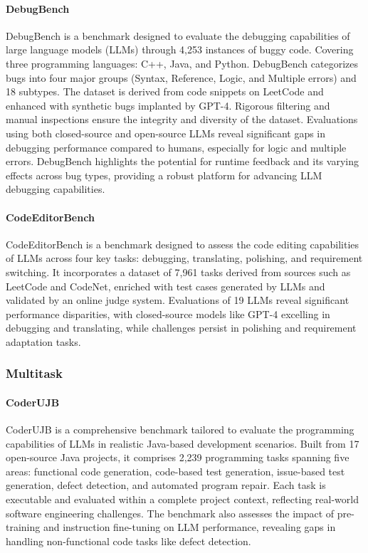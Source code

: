 \paragraph{DebugBench \cite{tian2024debugbench}}
DebugBench is a benchmark designed to evaluate the debugging capabilities of
large language models (LLMs) through 4,253 instances of buggy code. Covering
three programming languages: C++, Java, and Python. DebugBench categorizes bugs
into four major groups (Syntax, Reference, Logic, and Multiple errors) and 18
subtypes. The dataset is derived from code snippets on LeetCode and enhanced
with synthetic bugs implanted by GPT-4. Rigorous filtering and manual
inspections ensure the integrity and diversity of the dataset. Evaluations
using both closed-source and open-source LLMs reveal significant gaps in
debugging performance compared to humans, especially for logic and multiple
errors. DebugBench highlights the potential for runtime feedback and its
varying effects across bug types, providing a robust platform for advancing LLM
debugging capabilities.

\paragraph{CodeEditorBench \cite{guo2024codeeditorbench}}
CodeEditorBench is a benchmark designed to assess the code editing capabilities
of LLMs across four key tasks: debugging, translating,
polishing, and requirement switching. It incorporates a dataset of 7,961 tasks
derived from sources such as LeetCode and CodeNet, enriched with test cases
generated by LLMs and validated by an online judge system. Evaluations of 19
LLMs reveal significant performance disparities, with closed-source models like
GPT-4 excelling in debugging and translating, while challenges persist in
polishing and requirement adaptation tasks.

\subsubsection{Multitask}

\paragraph{CoderUJB \cite{zeng2024coderujb}}
CoderUJB is a comprehensive benchmark tailored to evaluate the programming
capabilities of LLMs in realistic Java-based development
scenarios. Built from 17 open-source Java projects, it comprises 2,239
programming tasks spanning five areas: functional code generation, code-based
test generation, issue-based test generation, defect detection, and automated
program repair. Each task is executable and evaluated within a complete project
context, reflecting real-world software engineering challenges. The benchmark
also assesses the impact of pre-training and instruction fine-tuning on LLM
performance, revealing gaps in handling non-functional code tasks like defect
detection.

